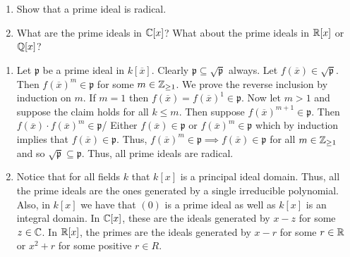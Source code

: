 \documentclass[letterpaper, 11pt, oneside]{book}
\begin{document}
\begin{exercise}\label{ex:UAG_1.1.8}
  \begin{enumerate}[label= (\alph*)]
    \item Show that a prime ideal is radical.
    \item What are the prime ideals in $\mathbb{C}[x]$?
          What about the prime ideals in $\mathbb{R}[x]$ or $\mathbb{Q}[x]$?
  \end{enumerate}
\end{exercise}
\begin{pf}
  \begin{enumerate}[label= (\alph*)]
    \item Let $\mathfrak{p}$ be a prime ideal in $k[\overline{x}]$.
          Clearly $\mathfrak{p} \subseteq \sqrt{\mathfrak{p}}$ always.
          Let $f(\overline{x}) \in \sqrt{\mathfrak{p}}$.
          Then $f(\overline{x})^{m} \in \mathfrak{p}$ for some $m \in \mathbb{Z}_{\geq 1}$.
          We prove the reverse inclusion by induction on $m$.
          If $m = 1$ then $f(\overline{x}) =f(\overline{x})^{1} \in \mathfrak{p}$.
          Now let $m > 1$ and suppose the claim holds for all $k \leq m$.
          Then suppose $f(\overline{x})^{m + 1} \in \mathfrak{p}$.
          Then $f(\overline{x}) \cdot f(\overline{x})^{m} \in \mathfrak{p}$/
          Either $f(\overline{x}) \in \mathfrak{p}$ or $f(\overline{x})^{m} \in \mathfrak{p}$ which by induction implies that $f(\overline{x}) \in \mathfrak{p}$.
          Thus, $f(\overline{x})^{m} \in \mathfrak{p} \implies f(\overline{x}) \in \mathfrak{p}$ for all $m \in \mathbb{Z}_{\geq 1}$ and so $\sqrt{\mathfrak{p}} \subseteq \mathfrak{p}$.
          Thus, all prime ideals are radical.
    \item Notice that for all fields $k$ that $k[x]$ is a principal ideal domain.
          Thus, all the prime ideals are the ones generated by a single irreducible polynomial.
          Also, in $k[x]$ we have that $(0)$ is a prime ideal as well as $k[x]$ is an integral domain.
          In $\mathbb{C}[x]$, these are the ideals generated by $x - z$ for some $z \in \mathbb{C}$.
          In $\mathbb{R}[x]$, the primes are the ideals generated by $x - r$ for some $r \in \mathbb{R}$ or $x^{2} + r$ for some positive $r \in R$.
  \end{enumerate}
\end{pf}

\clearpage
\end{document}

